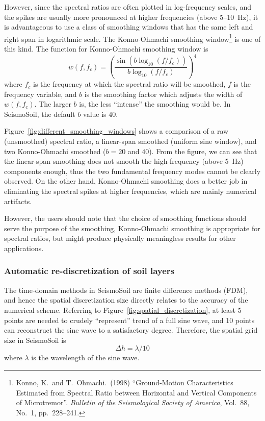 \documentclass[11pt,letterpaper]{article}
\begin{document}
 However, since the spectral ratios are often plotted in log-frequency scales, and the spikes are usually more pronounced at higher frequencies (above 5--10~Hz), it is advantageous to use a class of smoothing windows that has the same left and right span in logarithmic scale. The Konno-Ohmachi smoothing window\footnote{Konno, K.~and T.~Ohmachi.~(1998) ``Ground-Motion Characteristics Estimated from Spectral Ratio between Horizontal and Vertical Components of Microtremor''. \emph{Bulletin of the Seismological Society of America}, Vol.~88, No.~1, pp.~228--241.} is one of this kind. The function for Konno-Ohmachi smoothing window is
\begin{equation}\label{eq:konno-ohmachi}
	w(f,f_c) = \left(   \frac{ \sin\left(  b\log_{10}(f/f_c)  \right) }{ b\log_{10}(f/f_c) }   \right)^4
\end{equation}
where $f_c$ is the frequency at which the spectral ratio will be smoothed, $f$ is the frequency variable, and $b$ is the smoothing factor which adjusts the width of $w(f,f_c)$. The larger $b$ is, the less ``intense'' the smoothing would be. In SeismoSoil, the default $b$ value is $40$.





Figure~\ref{fig:different_smoothing_windows} shows a comparison of a raw (unsmoothed) spectral ratio, a linear-span smoothed (uniform sine window), and two Konno-Ohmachi smoothed ($b=20$ and $40$). From the figure, we can see that the linear-span smoothing does not smooth the high-frequency (above 5~Hz) components enough, thus the two fundamental frequency modes cannot be clearly observed. On the other hand, Konno-Ohmachi smoothing does a better job in eliminating the spectral spikes at higher frequencies, which are mainly numerical artifacts.



However, the users should note that the choice of smoothing functions should serve the purpose of the smoothing, Konno-Ohmachi smoothing is appropriate for spectral ratios, but might produce physically meaningless results for other applications.




\subsubsection{Automatic re-discretization of soil layers}\label{sec:rediscretization}

The time-domain methods in SeismoSoil are finite difference methods (FDM), and hence the spatial discretization size directly relates to the accuracy of the numerical scheme. Referring to Figure~\ref{fig:spatial_discretization}, at least 5 points are needed to crudely ``represent'' trend of a full sine wave, and 10 points can reconstruct the sine wave to a satisfactory degree. Therefore, the spatial grid size in SeismoSoil is
\[
\Delta h = \lambda/10
\]
where $ \lambda $ is the wavelength of the sine wave.
\end{document}
